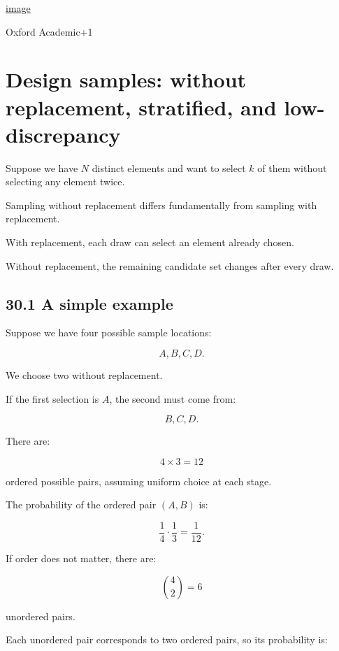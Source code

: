 \href{https://www.google.com/s2/favicons?domain=https://academic.oup.com&sz=32}{image}

Oxford Academic+1

\section{Design samples: without replacement, stratified, and low-discrepancy}\label{02-foundations-ii-ch031-design-samples-without-replacement-stratified-and-low-discrepancy}

\hypertarget{02-foundations-ii-ch031-design-samples-without-replacement-stratified-and-low-discrepancy}{}

Suppose we have \(N\) distinct elements and want to select \(k\) of them without selecting any element twice.

Sampling without replacement differs fundamentally from sampling with replacement.

With replacement, each draw can select an element already chosen.

Without replacement, the remaining candidate set changes after every draw.

\subsection{30.1 A simple example}\label{02-foundations-ii-ch031-a-simple-example}

\hypertarget{02-foundations-ii-ch031-a-simple-example}{}

Suppose we have four possible sample locations:

\[ A,B,C,D. \]

We choose two without replacement.

If the first selection is \(A\), the second must come from:

\[ B,C,D. \]

There are:

\[ 4\times3=12 \]

ordered possible pairs, assuming uniform choice at each stage.

The probability of the ordered pair \((A,B)\) is:

\[ \frac14\cdot\frac13=\frac1{12}. \]

If order does not matter, there are:

\[ \binom42=6 \]

unordered pairs.

Each unordered pair corresponds to two ordered pairs, so its probability is:

